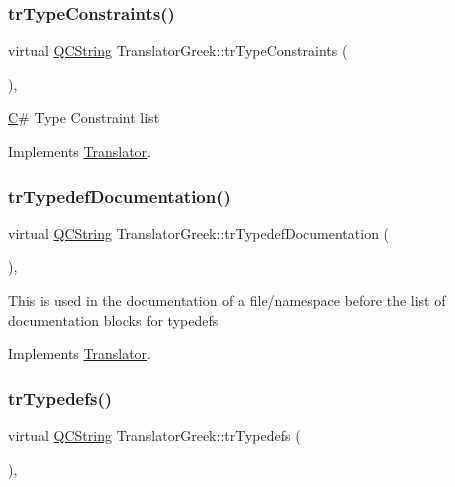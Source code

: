 \subsubsection{\texorpdfstring{trTypeConstraints()}{trTypeConstraints()}}
{\footnotesize\ttfamily virtual \mbox{\hyperlink{class_q_c_string}{Q\+C\+String}} Translator\+Greek\+::tr\+Type\+Constraints (\begin{DoxyParamCaption}{ }\end{DoxyParamCaption})\hspace{0.3cm}{\ttfamily [inline]}, {\ttfamily [virtual]}}

\mbox{\hyperlink{class_c}{C}}\# Type Constraint list 

Implements \mbox{\hyperlink{class_translator}{Translator}}.

\mbox{\label{class_translator_greek_a71d95e4ed45922566dc7f1a7eb554233}} 
\subsubsection{\texorpdfstring{trTypedefDocumentation()}{trTypedefDocumentation()}}
{\footnotesize\ttfamily virtual \mbox{\hyperlink{class_q_c_string}{Q\+C\+String}} Translator\+Greek\+::tr\+Typedef\+Documentation (\begin{DoxyParamCaption}{ }\end{DoxyParamCaption})\hspace{0.3cm}{\ttfamily [inline]}, {\ttfamily [virtual]}}

This is used in the documentation of a file/namespace before the list of documentation blocks for typedefs 

Implements \mbox{\hyperlink{class_translator}{Translator}}.

\mbox{\label{class_translator_greek_a5ae744d0289867d766dc5883ac3b3496}} 
\subsubsection{\texorpdfstring{trTypedefs()}{trTypedefs()}}
{\footnotesize\ttfamily virtual \mbox{\hyperlink{class_q_c_string}{Q\+C\+String}} Translator\+Greek\+::tr\+Typedefs (\begin{DoxyParamCaption}{ }\end{DoxyParamCaption})\hspace{0.3cm}{\ttfamily [inline]}, {\ttfamily [virtual]}}

